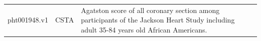 \documentclass[11pt]{article}
\begin{document}
\begin{tabular}{r|lll}
	 pht001948.v1                                                                                                                                                                                                                                                                                                                                                                                                                                                                                                                                                                                                                                                                                                                                                                                                                                                                                                                                                                                  & CSTA                                                                                                                                                                                                                                                                                                                                                                                                                                                                                                                                                                                                                                                                                                                                                                                                                                                                                                                                                                                          & Agatston score of all coronary section among participants of the Jackson Heart Study including adult 35-84 years old African Americans.                                                                                                                                                                                                                                                                                                                                                                                                                                                                                                                                                                                                                                                                                                                                                                                                                                                      \\

\end{tabular}
\end{document}
